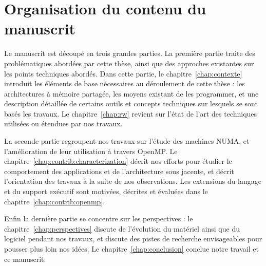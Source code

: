 \section{Organisation du contenu du manuscrit}\label{sec:intro:outline}

Le manuscrit est découpé en trois grandes parties.
La première partie traite des problématiques abordées par cette thèse, ainsi que des approches existantes sur les points techniques abordés.
Dans cette partie, le chapitre~\ref{chap:contexte} introduit les éléments de base nécessaires au déroulement de cette thèse : les architectures à mémoire partagée, les moyens existant de les programmer, et une description détaillée de certains outils et concepts techniques sur lesquels se sont basés les travaux.
Le chapitre~\ref{chap:rw} revient sur l'état de l'art des techniques utilisées ou étendues par nos travaux.

La seconde partie regroupent nos travaux sur l'étude des machines NUMA, et l'amélioration de leur utilisation à travers OpenMP.
Le chapitre~\ref{chap:contrib:characterization} décrit nos efforts pour étudier le comportement des applications et de l'architecture sous jacente, et décrit l'orientation des travaux à la suite de nos observations.
Les extensions du langage et du support exécutif sont motivées, décrites et évaluées dans le chapitre~\ref{chap:contrib:openmp}.

Enfin la dernière partie se concentre sur les perspectives : le chapitre~\ref{chap:perspectives} discute de l'évolution du matériel ainsi que du logiciel pendant nos travaux, et discute des pistes de recherche envisageables pour pousser plus loin nos idées. Le chapitre~\ref{chap:conclusion} conclue notre travail et ce manuscrit.
